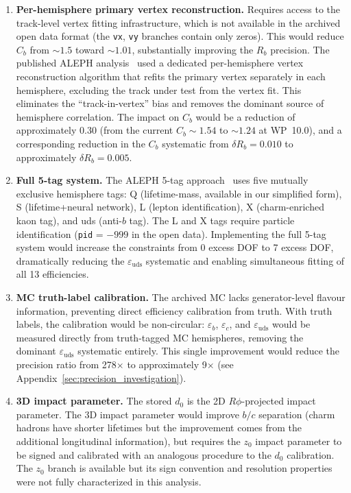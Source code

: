 \documentclass[11pt,a4paper]{article}
\begin{document}
\begin{enumerate}
\item \textbf{Per-hemisphere primary vertex reconstruction.} Requires access to the
track-level vertex fitting infrastructure, which is not available in the archived
open data format (the \texttt{vx}, \texttt{vy} branches contain only zeros). This
would reduce $C_b$ from $\sim 1.5$ toward $\sim 1.01$, substantially improving the
$R_b$ precision. The published ALEPH analysis~\cite{ALEPH:Rb:1996} used a dedicated
per-hemisphere vertex reconstruction algorithm that refits the primary vertex
separately in each hemisphere, excluding the track under test from the vertex fit.
This eliminates the ``track-in-vertex'' bias and removes the dominant source of
hemisphere correlation. The impact on $C_b$ would be a reduction of approximately
0.30 (from the current $C_b \sim 1.54$ to $\sim 1.24$ at WP~10.0), and a corresponding
reduction in the $C_b$ systematic from $\delta R_b = 0.010$ to approximately
$\delta R_b = 0.005$.

\item \textbf{Full 5-tag system.} The ALEPH 5-tag approach~\cite{ALEPH:Rb:1996}
uses five mutually exclusive hemisphere tags: Q (lifetime-mass, available in our
simplified form), S (lifetime+neural network), L (lepton identification), X
(charm-enriched kaon tag), and uds (anti-$b$ tag). The L and X tags require
particle identification (\texttt{pid} = $-999$ in the open data). Implementing the
full 5-tag system would increase the constraints from 0 excess DOF to 7 excess DOF,
dramatically reducing the $\varepsilon_\mathrm{uds}$ systematic and enabling
simultaneous fitting of all 13 efficiencies.

\item \textbf{MC truth-label calibration.} The archived MC lacks generator-level
flavour information, preventing direct efficiency calibration from truth. With truth
labels, the calibration would be non-circular: $\varepsilon_b$, $\varepsilon_c$, and
$\varepsilon_\mathrm{uds}$ would be measured directly from truth-tagged MC
hemispheres, removing the dominant $\varepsilon_\mathrm{uds}$ systematic entirely.
This single improvement would reduce the precision ratio from 278$\times$ to
approximately 9$\times$ (see Appendix~\ref{sec:precision_investigation}).

\item \textbf{3D impact parameter.} The stored $d_0$ is the 2D $R\phi$-projected
impact parameter. The 3D impact parameter would improve $b/c$ separation (charm
hadrons have shorter lifetimes but the improvement comes from the additional
longitudinal information), but requires the $z_0$ impact parameter to be signed and
calibrated with an analogous procedure to the $d_0$ calibration. The $z_0$ branch
is available but its sign convention and resolution properties were not fully
characterized in this analysis.


\end{enumerate}
\end{document}
